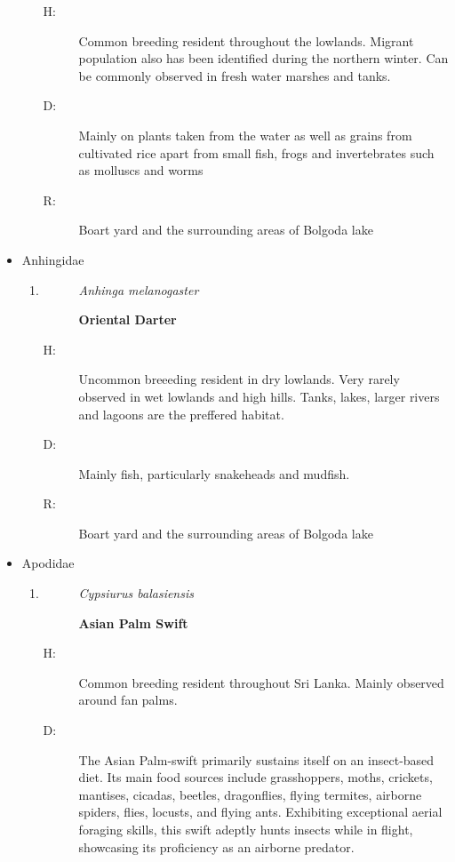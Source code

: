 \begin{itemize}
\begin{enumerate}
\begin{description}
\end{description}%
\begin{description}%
\item[H: ]%
Common breeding resident throughout the lowlands. Migrant population also has been identified during the northern winter. Can be commonly observed in fresh water marshes and tanks.%
\item[D: ]%
Mainly on plants taken from the water as well as grains from cultivated rice apart from small fish, frogs and invertebrates such as molluscs and worms%
\item[R: ]%
Boart yard and the surrounding areas of Bolgoda lake%
\end{description}%
\end{enumerate}%
\item%
Anhingidae%
\begin{enumerate}%
\item%
\begin{description}%
\item[]%
\textit{Anhinga melanogaster}%
\item[]%
\textbf{Oriental Darter}%
\end{description}%
\begin{description}%
\item[H: ]%
Uncommon breeeding resident in dry lowlands. Very rarely observed in wet lowlands and high hills. Tanks, lakes, larger rivers and lagoons are the preffered habitat.%
\item[D: ]%
Mainly fish, particularly snakeheads and mudfish.%
\item[R: ]%
Boart yard and the surrounding areas of Bolgoda lake%
\end{description}%
\end{enumerate}%
\item%
Apodidae%
\begin{enumerate}%
\item%
\begin{description}%
\item[]%
\textit{Cypsiurus balasiensis}%
\item[]%
\textbf{Asian Palm Swift}%
\end{description}%
\begin{description}%
\item[H: ]%
Common breeding resident throughout Sri Lanka. Mainly observed around fan palms.%
\item[D: ]%
The Asian Palm{-}swift primarily sustains itself on an insect{-}based diet. Its main food sources include grasshoppers, moths, crickets, mantises, cicadas, beetles, dragonflies, flying termites, airborne spiders, flies, locusts, and flying ants. Exhibiting exceptional aerial foraging skills, this swift adeptly hunts insects while in flight, showcasing its proficiency as an airborne predator.%

\end{description}
\end{enumerate}
\end{itemize}
